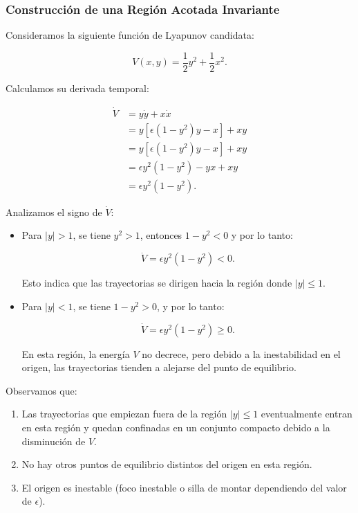 \documentclass[12pt, a4paper]{report}
\begin{document}
\subsubsection{Construcción de una Región Acotada Invariante}

Consideramos la siguiente función de Lyapunov candidata:

\begin{equation}
    V(x, y) = \dfrac{1}{2} y^2 + \dfrac{1}{2} x^2.
\end{equation}

Calculamos su derivada temporal:

\begin{align}
    \dot{V} &= y \dot{y} + x \dot{x} \\
    &= y \left[ \epsilon \left(1 - y^2\right) y - x \right] + x y \\
    &= y \left[ \epsilon \left(1 - y^2\right) y - x \right] + x y \\
    &= \epsilon y^2 \left(1 - y^2\right) - y x + x y \\
    &= \epsilon y^2 \left(1 - y^2\right).
\end{align}

Analizamos el signo de \(\dot{V}\):

\begin{itemize}
    \item Para \( |y| > 1 \), se tiene \( y^2 > 1 \), entonces \( 1 - y^2 < 0 \) y por lo tanto:

    \begin{equation}
        \dot{V} = \epsilon y^2 (1 - y^2) < 0.
    \end{equation}

    Esto indica que las trayectorias se dirigen hacia la región donde \( |y| \leq 1 \).

    \item Para \( |y| < 1 \), se tiene \( 1 - y^2 > 0 \), y por lo tanto:

    \begin{equation}
        \dot{V} = \epsilon y^2 (1 - y^2) \geq 0.
    \end{equation}

    En esta región, la energía \( V \) no decrece, pero debido a la inestabilidad en el origen, las trayectorias tienden a alejarse del punto de equilibrio.
\end{itemize}

Observamos que:

\begin{enumerate}
    \item Las trayectorias que empiezan fuera de la región \( |y| \leq 1 \) eventualmente entran en esta región y quedan confinadas en un conjunto compacto debido a la disminución de \( V \).

    \item No hay otros puntos de equilibrio distintos del origen en esta región.

    \item El origen es inestable (foco inestable o silla de montar dependiendo del valor de \(\epsilon\)).
\end{enumerate}
\end{document}
